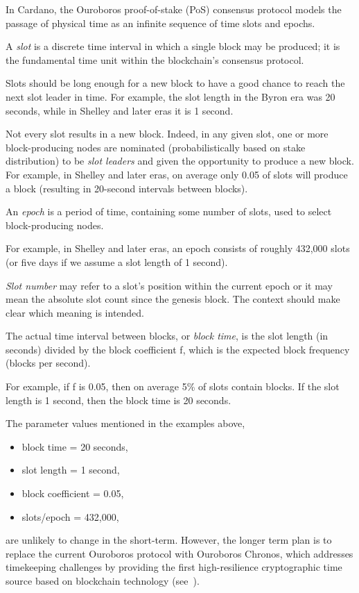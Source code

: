 In Cardano, the Ouroboros proof-of-stake (PoS) consensus protocol models the passage
of physical time as an infinite sequence of time slots and epochs.

\begin{definition}[slot]
  A \emph{slot} is a discrete time interval in which a single block may be produced; it
  is the fundamental time unit within the blockchain's consensus protocol.
\end{definition}
Slots should be long enough for a new block to have a good chance to reach
the next slot leader in time.  For example, the slot length in the Byron era was 20
seconds, while in Shelley and later eras it is 1 second.

Not every slot results in a new block.  Indeed, in any given slot, one or more
block-producing nodes are nominated (probabilistically based on stake distribution)
to be \textit{slot leaders} and given the opportunity to produce a new block.
For example, in Shelley and later eras, on average only 0.05 of slots will produce a
block (resulting in 20-second intervals between blocks).

\begin{definition}[epoch]
  An \emph{epoch} is a period of time, containing some number of slots, used to select
  block-producing nodes.
\end{definition}
For example, in Shelley and later eras, an epoch consists of roughly 432,000 slots (or five
days if we assume a slot length of 1 second).

\begin{definition}
  \emph{Slot number} may refer to a slot's position within the current epoch or it
  may mean the absolute slot count since the genesis block.  The context should make
  clear which meaning is intended.
\end{definition}

\begin{definition}
  The actual time interval between blocks, or \emph{block time}, is the slot length
  (in seconds) divided by the block coefficient f, which is the expected block
  frequency (blocks per second).
\end{definition}
For example, if f is 0.05, then on average 5\% of slots contain blocks.
If the slot length is 1 second, then the block time is 20 seconds.

The parameter values mentioned in the examples above,
\begin{itemize}[noitemsep]
  \item block time = 20 seconds,
  \item slot length = 1 second,
  \item block coefficient = 0.05,
  \item slots/epoch = 432,000,
\end{itemize}
are unlikely to change in the short-term.  However, the longer term plan is to replace the current Ouroboros  protocol with Ouroboros Chronos, which addresses timekeeping challenges by providing the first
high-resilience cryptographic time source based on blockchain technology (see~\textcite{www-iohk-blog-ouroboros}).
